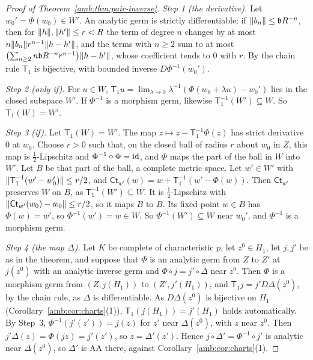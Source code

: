\begin{proof}[Proof of Theorem~\ref{amb:thm:pair-inverse}]
\emph{Step 1 (the derivative).} Let $w_0'=\Phi(w_0)\in W'$. An analytic germ is strictly differentiable: if $\lVert b_n\rVert\le \mathfrak bR^{-n}$, then for $\lVert h\rVert,\lVert h'\rVert\le r<R$ the term of degree $n$ changes by at most $n\lVert b_n\rVert r^{n-1}\lVert h-h'\rVert$, and the terms with $n\ge2$ sum to at most $\bigl(\sum_{n\ge2}n\mathfrak bR^{-n}r^{n-1}\bigr)\lVert h-h'\rVert$, whose coefficient tends to $0$ with $r$. By the chain rule $\mathsf T_1$ is bijective, with bounded inverse $D\Phi^{-1}(w_0')$.

\emph{Step 2 (only if).} For $u\in W$, $\mathsf T_1u=\lim_{\lambda\to0}\lambda^{-1}(\Phi(w_0+\lambda u)-w_0')$ lies in the closed subspace $W'$. If $\Phi^{-1}$ is a morphism germ, likewise $\mathsf T_1^{-1}(W')\subseteq W$. So $\mathsf T_1(W)=W'$.

\emph{Step 3 (if).} Let $\mathsf T_1(W)=W'$. The map $z\mapsto z-\mathsf T_1^{-1}\Phi(z)$ has strict derivative $0$ at $w_0$. Choose $r>0$ such that, on the closed ball of radius $r$ about $w_0$ in $Z$, this map is $\frac12$-Lipschitz and $\Phi^{-1}\circ\Phi=\mathrm{id}$, and $\Phi$ maps the part of the ball in $W$ into $W'$. Let $B$ be that part of the ball, a complete metric space. Let $w'\in W'$ with $\lVert \mathsf T_1^{-1}(w'-w_0')\rVert\le r/2$, and $\mathsf{Ct}_{w'}(w)=w+\mathsf T_1^{-1}(w'-\Phi(w))$. Then $\mathsf{Ct}_{w'}$ preserves $W$ on $B$, as $\mathsf T_1^{-1}(W')\subseteq W$. It is $\frac12$-Lipschitz with $\lVert \mathsf{Ct}_{w'}(w_0)-w_0\rVert\le r/2$, so it maps $B$ to $B$. Its fixed point $w\in B$ has $\Phi(w)=w'$, so $\Phi^{-1}(w')=w\in W$. So $\Phi^{-1}(W')\subseteq W$ near $w_0'$, and $\Phi^{-1}$ is a morphism germ.

\emph{Step 4 (the map $\Delta$).} Let $K$ be complete of characteristic $p$, let $z^0\in H_1$, let $j,j'$ be as in the theorem, and suppose that $\Phi$ is an analytic germ from $Z$ to $Z'$ at $j(z^0)$ with an analytic inverse germ and $\Phi\circ j=j'\circ\Delta$ near $z^0$. Then $\Phi$ is a morphism germ from $(Z,j(H_1))$ to $(Z',j'(H_1))$, and $\mathsf T_1j=j'D\Delta(z^0)$, by the chain rule, as $\Delta$ is differentiable. As $D\Delta(z^0)$ is bijective on $H_1$ (Corollary~\ref{amb:cor:charts}(1)), $\mathsf T_1(j(H_1))=j'(H_1)$ holds automatically. By Step~3, $\Phi^{-1}(j'(z'))=j(z)$ for $z'$ near $\Delta(z^0)$, with $z$ near $z^0$. Then $j'\Delta(z)=\Phi(jz)=j'(z')$, so $z=\Delta'(z')$. Hence $j\circ\Delta'=\Phi^{-1}\circ j'$ is analytic near $\Delta(z^0)$, so $\Delta'$ is AA there, against Corollary~\ref{amb:cor:charts}(1).
\end{proof}

